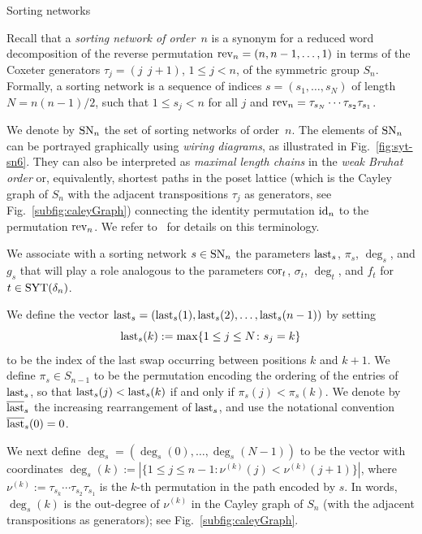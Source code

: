 \documentclass[a4paper,reqno,12pt]{amsart}
\makeatletter
\theoremstyle{plain}
\theoremstyle{definition}
\renewcommand\subsection{\@startsection{subsection}{2}%
  \z@{.5\linespacing\@plus.7\linespacing}{-.5em}%
  {\bfseries\scshape}}
\newcommand{\firstmention}{\emph}
\newcommand{\sym}{S}
\newcommand{\syt}{\textnormal{SYT}}
\newcommand{\staircase}{\delta}
\newcommand{\sort}{\textnormal{SN}}
\newcommand{\diag}{\textnormal{cor}}
\newcommand{\rev}{\textnormal{rev}}
\newcommand{\id}{\textnormal{id}}
\newcommand{\fin}{\textnormal{last}}
\newcommand{\finsorted}{\overline{\fin}}
\newcommand{\1}{\mathbbm{1}}
\makeatother
\begin{document}
\subsection{Sorting networks}
\label{subsec:sortingNetworks}

Recall that a \firstmention{sorting network of order~$n$} is a synonym for a reduced word decomposition of the reverse permutation $\rev_n = (n,n-1,\ldots,1)$ in terms of the Coxeter generators $\tau_j = (j \ \ j+1)$, $1\le j< n $, of the symmetric group $S_n$.
Formally, a sorting network is a sequence of indices $s=(s_1,\ldots,s_{N})$ of length $N=n(n-1)/2$, such that
$ 1\le s_j <n $ for all $j$ and 
$ \rev_n = \tau_{s_{N}} \cdots \tau_{s_2} \tau_{s_1}$.

We denote by $\sort_n$ the set of sorting networks of order~$n$.
The elements of $\sort_n$ can be portrayed graphically using \firstmention{wiring diagrams}, as illustrated in Fig.~\ref{fig:syt-sn6}.
They can also be interpreted as \firstmention{maximal length chains} in the \firstmention{weak  Bruhat order} or, equivalently, shortest paths in the poset lattice (which is the Cayley graph of $\sym_n$ with the adjacent transpositions $\tau_j$ as generators, see Fig.~\ref{subfig:caleyGraph}) connecting the identity permutation $\id_n$ to the permutation $\rev_n$.
We refer to~\cite{bjoernerBrenti05, humphreys90} for details on this terminology.

We associate with a sorting network $s \in \sort_n$ the parameters $\fin_s$, $\pi_s$, $\deg_s$, and $g_s$ that will play a role analogous to the parameters $\diag_t$, $\sigma_t$, $\deg_t$, and $f_t$ for $t\in \syt(\staircase_n)$.

We define the vector $ \fin_s = (\fin_s(1),\fin_s(2),\ldots,\fin_s(n-1))$ by setting
\[
\fin_s(k) := \max\{ 1\le j \le N\colon s_j = k \}
\]
to be the index of the last swap occurring between positions $k$ and $k+1$.
We define $\pi_s \in \sym_{n-1}$ to be the permutation encoding the ordering of the entries of $\fin_s$, so that $\fin_s(j) < \fin_s(k)$ if and only if $\pi_s(j) < \pi_s(k)$. 
We denote by $\finsorted_s$ the increasing rearrangement of $\fin_s$, and use the notational convention $\finsorted_s(0)=0$.

We next define $\deg_s = (\deg_s(0),\ldots,\deg_s(N-1))$ to be the vector with coordinates
$\deg_s(k) := |\{ 1\le j\le n-1\colon \nu^{(k)}(j)<\nu^{(k)}(j+1)\}|$,
where $\nu^{(k)} := \tau_{s_k}\cdots \tau_{s_2}\tau_{s_1}$ is the $k$-th permutation in the path encoded by $s$.
In  words, $\deg_s(k)$ is the out-degree of $\nu^{(k)}$ in the Cayley graph of $S_n$ (with the adjacent transpositions as generators); see Fig.~\ref{subfig:caleyGraph}.
\end{document}
